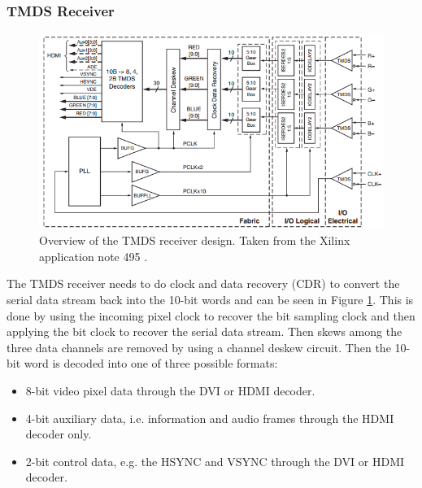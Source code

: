 \subsubsection{TMDS Receiver}
\begin{figure}[h!]
    \centering
    \includegraphics[width=\linewidth]{img/TMDSreceiverdesign.png}
    \caption{Overview of the TMDS receiver design. Taken from the Xilinx application note 495 \cite{xapp495}.}
    \label{fig:TMDSReceiver}
\end{figure}
The TMDS receiver needs to do clock and data recovery (CDR) to convert the serial data stream back into the 10-bit words and can be seen in Figure \ref{fig:TMDSReceiver}.
This is done by using the incoming pixel clock to recover the bit sampling clock and then applying the bit clock to recover the serial data stream.
Then skews among the three data channels are removed by using a channel deskew circuit.
Then the 10-bit word is decoded into one of three possible formats:
\begin{itemize}
    \item   8-bit video pixel data through the DVI or HDMI decoder.
    \item   4-bit auxiliary data, i.e. information and audio frames through the HDMI decoder only.
    \item   2-bit control data, e.g. the HSYNC and VSYNC through the DVI or HDMI decoder.
\end{itemize}

